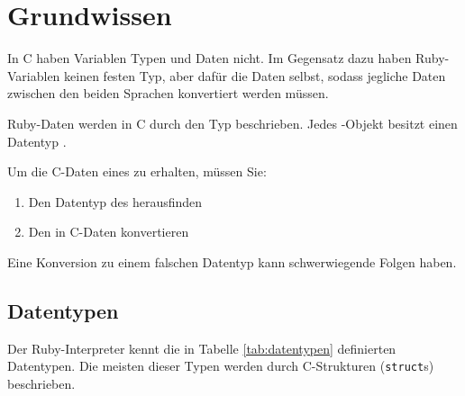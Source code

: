 \chapter{Grundwissen}
\label{cha:grundwissen}

In C haben Variablen Typen und Daten nicht. Im Gegensatz dazu haben
Ruby-Variablen keinen festen Typ, aber dafür die Daten selbst, sodass
jegliche Daten zwischen den beiden Sprachen konvertiert werden
müssen.

Ruby-Daten werden in C durch den Typ \VALUE beschrieben. Jedes
\VALUE-Objekt besitzt einen Datentyp .

Um die C-Daten eines \VALUEs zu erhalten, müssen Sie: 

\begin{enumerate}
\item Den Datentyp des \VALUEs herausfinden
\item Den \VALUE in C-Daten konvertieren
\end{enumerate}

Eine Konversion zu einem falschen Datentyp kann schwerwiegende Folgen
haben.

\section{Datentypen}
\label{sec:datentypen}

Der Ruby-Interpreter kennt die in Tabelle \ref{tab:datentypen}
definierten Datentypen. Die meisten dieser Typen werden durch
C-Strukturen (\verb+struct+s) beschrieben.

